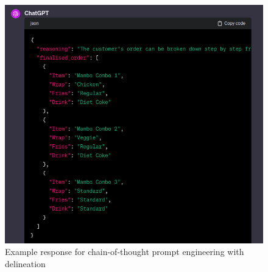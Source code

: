 \begin{figure}
    \centering
    \includegraphics[width=1\linewidth]{sections//images/cot_with_delineation_response.png}
    \caption{Example response for chain-of-thought prompt engineering with delineation}
    \label{fig:c-o-t-delin-response}
\end{figure}